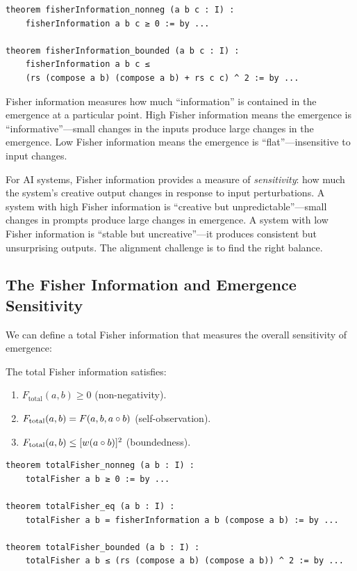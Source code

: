 \begin{lstlisting}[caption={Fisher information (IDT\_v3\_Emergence.lean)}]
theorem fisherInformation_nonneg (a b c : I) :
    fisherInformation a b c ≥ 0 := by ...

theorem fisherInformation_bounded (a b c : I) :
    fisherInformation a b c ≤
    (rs (compose a b) (compose a b) + rs c c) ^ 2 := by ...
\end{lstlisting}

\begin{interpretation}
Fisher information measures how much ``information'' is contained in the
emergence at a particular point. High Fisher information means the emergence
is ``informative''---small changes in the inputs produce large changes in the
emergence. Low Fisher information means the emergence is ``flat''---insensitive
to input changes.

For AI systems, Fisher information provides a measure of \emph{sensitivity}:
how much the system's creative output changes in response to input perturbations.
A system with high Fisher information is ``creative but unpredictable''---small
changes in prompts produce large changes in emergence. A system with low Fisher
information is ``stable but uncreative''---it produces consistent but unsurprising
outputs. The alignment challenge is to find the right balance.
\end{interpretation}

\subsection{The Fisher Information and Emergence Sensitivity}

We can define a total Fisher information that measures the overall sensitivity
of emergence:

\begin{theorem}
\label{thm:total-fisher}
The total Fisher information satisfies:
\begin{enumerate}
  \item $F_{\text{total}}(a, b) \geq 0$ (non-negativity).
  \item $F_{\text{total}}(a, b) = F(a, b, a \circ b)$ (self-observation).
  \item $F_{\text{total}}(a, b) \leq [w(a \circ b)]^2$ (boundedness).
\end{enumerate}
\end{theorem}

\begin{lstlisting}[caption={Total Fisher information (IDT\_v3\_Emergence.lean)}]
theorem totalFisher_nonneg (a b : I) :
    totalFisher a b ≥ 0 := by ...

theorem totalFisher_eq (a b : I) :
    totalFisher a b = fisherInformation a b (compose a b) := by ...

theorem totalFisher_bounded (a b : I) :
    totalFisher a b ≤ (rs (compose a b) (compose a b)) ^ 2 := by ...
\end{lstlisting}

